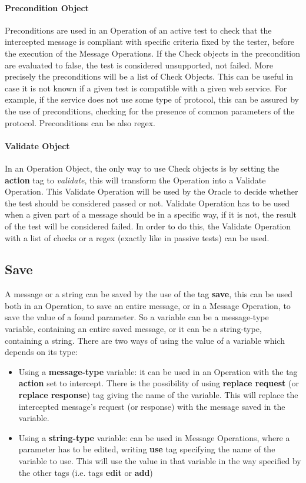 \paragraph{Precondition Object}
Preconditions are used in an Operation of an active test to check that the intercepted message is compliant with specific criteria fixed by the tester, before the execution of the Message Operations. If the Check objects in the precondition are evaluated to false, the test is considered unsupported, not failed. More precisely the preconditions will be a list of Check Objects. This can be useful in case it is not known if a given test is compatible with a given web service. For example, if the service does not use some type of protocol, this can be assured by the use of preconditions, checking for the presence of common parameters of the protocol. Preconditions can be also regex.
\paragraph{Validate Object}
In an Operation Object, the only way to use Check objects is by setting the \textbf{action} tag to \textit{validate}, this will transform the Operation into a Validate Operation. This Validate Operation will be used by the Oracle to decide whether the test should be considered passed or not. Validate Operation has to be used when a given part of a message should be in a specific way, if it is not, the result of the test will be considered failed.
In order to do this, the Validate Operation with a list of checks or a regex (exactly like in passive tests) can be used.

\subsection{Save}
A message or a string can be saved by the use of the tag \textbf{save}, this can be used both in an Operation, to save an entire message, or in a Message Operation, to save the value of a found parameter. So a variable can be a message-type variable, containing an entire saved message, or it can be a string-type, containing a string.
There are two ways of using the value of a variable which depends on its type:
\begin{itemize}
    \item Using a \textbf{message-type} variable: it can be used in an Operation with the tag \textbf{action} set to intercept. There is the possibility of using \textbf{replace request} (or \textbf{replace response}) tag giving the name of the variable. This will replace the intercepted message's request (or response) with the message saved in the variable.
    \item Using a \textbf{string-type} variable: can be used in Message Operations, where a parameter has to be edited, writing \textbf{use} tag specifying the name of the variable to use. This will use the value in that variable in the way specified by the other tags (i.e. tags \textbf{edit} or \textbf{add})
\end{itemize}

